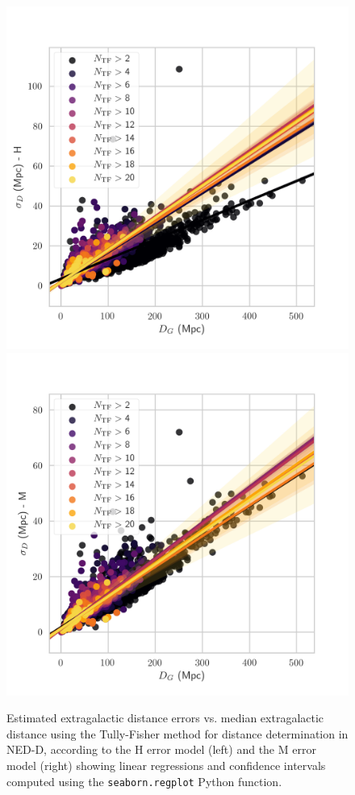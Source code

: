 \documentclass[a4paper,fleqn,usenatbib]{mnras}
\begin{document}
\begin{figure}
	\includegraphics[scale=0.69]{f06HrelerrTF.png}
	\includegraphics[scale=0.69]{f07MrelerrTF.png}
    \caption{Estimated extragalactic distance errors vs. median extragalactic distance using the Tully-Fisher method for distance determination in NED-D, according to the H error model (left) and the M error model (right) showing linear regressions and confidence intervals computed using the \texttt{seaborn.regplot} Python function.}
    \label{fig:relerr}
\end{figure}
\end{document}
